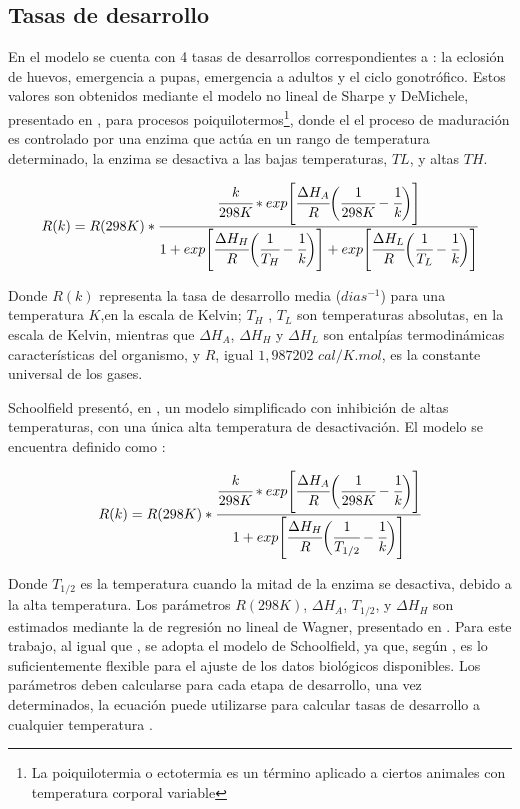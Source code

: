 \subsection{Tasas de desarrollo}
\label{subsec:cap4-tasas de desarrollo}
En el modelo se cuenta con 4 tasas de desarrollos correspondientes a : la eclosión de huevos,
emergencia a pupas, emergencia a adultos y el ciclo gonotrófico. Estos valores son obtenidos
mediante el modelo no lineal de Sharpe y DeMichele, presentado en \cite{sharpe1977reaction}, para procesos poiquilotermos\footnote{ La poiquilotermia o ectotermia es un término aplicado a ciertos
animales con temperatura corporal variable}, donde el el proceso de maduración es controlado por
una enzima que actúa en un rango de temperatura determinado, la enzima se desactiva a las bajas temperaturas, $TL$, y altas $TH$.

\begin{equation} \label{eq:sharpe-demichele}
   R(k)  = R(298K) *\cfrac{ \cfrac{k}{298K} *
    exp \Bigg[
            \cfrac{\Delta H_{A}}{R} \bigg(\cfrac{1}{298K} - \cfrac{1}{k}\bigg)
        \Bigg]}
    {1 + exp\Bigg[\cfrac{\Delta H_{H}}{R} \bigg(\cfrac{1}{T_{H}}- \cfrac{1}{k}\bigg)\Bigg] +  exp\Bigg[\cfrac{\Delta H_{L}}{R} \bigg(\cfrac{1}{T_{L}}- \cfrac{1}{k}\bigg)\Bigg]}
\end{equation}

Donde $R(k)$ representa la tasa de desarrollo media ($dias^{-1}$) para una temperatura $K$,en la
escala de Kelvin; $T_{H}$ , $T_{L}$ son temperaturas absolutas, en la escala de Kelvin, mientras
que $\Delta H_{A}$, $\Delta H_{H}$ y $\Delta H_{L}$ son entalpías termodinámicas características
del organismo, y $R$, igual $1,987202$ $cal/K.mol$, es la constante universal de los gases.

Schoolfield presentó, en \cite{schoolfield1981non}, un modelo simplificado con inhibición de altas
temperaturas, con una única alta temperatura de desactivación. El modelo se encuentra definido
como :

\begin{equation} \label{eq:schoolfield}
   R(k)  = R(298K) *\cfrac{ \cfrac{k}{298K} *
    exp \Bigg[
            \cfrac{\Delta H_{A}}{R} \bigg(\cfrac{1}{298K} - \cfrac{1}{k}\bigg)
        \Bigg]}
    {1 + exp\Bigg[\cfrac{\Delta H_{H}}{R} \bigg(\cfrac{1}{T_{1/2}}- \cfrac{1}{k}\bigg)\Bigg] }
\end{equation}

Donde $T_{1/2}$ es la temperatura cuando la mitad de la enzima se desactiva, debido a la alta
temperatura. Los parámetros $R(298K)$, $\Delta H_{A}$, $T_{1/2}$, y $\Delta H_{H}$ son estimados
mediante la de regresión no lineal de Wagner, presentado en \cite{wagner1984modeling}. Para este
trabajo, al igual que \cite{rueda1990temperature, otero2006stochastic}, se adopta el modelo de
Schoolfield, ya que, según \cite{otero2006stochastic}, es lo suficientemente flexible para el
ajuste de los datos biológicos disponibles. Los parámetros deben calcularse para cada etapa de
desarrollo, una vez determinados, la ecuación puede utilizarse para calcular tasas de desarrollo a
cualquier temperatura \cite{rueda1990temperature}.
